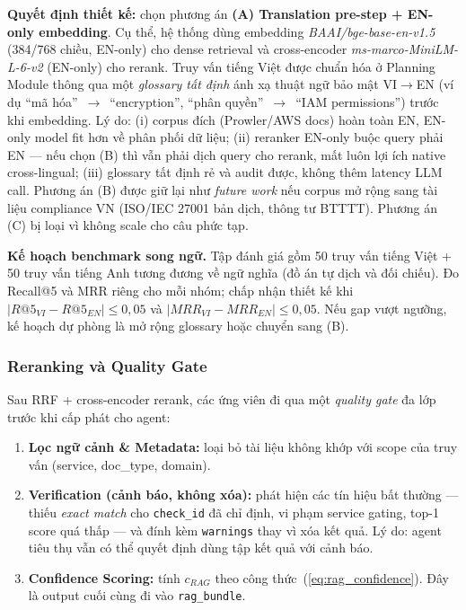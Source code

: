\textbf{Quyết định thiết kế:} chọn phương án \textbf{(A) Translation pre-step + EN-only embedding}. Cụ thể, hệ thống dùng embedding \textit{BAAI/bge-base-en-v1.5} (384/768 chiều, EN-only) cho dense retrieval và cross-encoder \textit{ms-marco-MiniLM-L-6-v2} (EN-only) cho rerank. Truy vấn tiếng Việt được chuẩn hóa ở Planning Module thông qua một \textit{glossary tất định} ánh xạ thuật ngữ bảo mật VI$\rightarrow$EN (ví dụ ``mã hóa''~$\rightarrow$~``encryption'', ``phân quyền''~$\rightarrow$~``IAM permissions'') trước khi embedding. Lý do: (i) corpus đích (Prowler/AWS docs) hoàn toàn EN, EN-only model fit hơn về phân phối dữ liệu; (ii) reranker EN-only buộc query phải EN — nếu chọn (B) thì vẫn phải dịch query cho rerank, mất luôn lợi ích native cross-lingual; (iii) glossary tất định rẻ và audit được, không thêm latency LLM call. Phương án (B) được giữ lại như \textit{future work} nếu corpus mở rộng sang tài liệu compliance VN (ISO/IEC 27001 bản dịch, thông tư BTTTT). Phương án (C) bị loại vì không scale cho câu phức tạp.

\textbf{Kế hoạch benchmark song ngữ.} Tập đánh giá gồm 50 truy vấn tiếng Việt + 50 truy vấn tiếng Anh tương đương về ngữ nghĩa (đồ án tự dịch và đối chiếu). Đo Recall@5 và MRR riêng cho mỗi nhóm; chấp nhận thiết kế khi $|R@5_{VI} - R@5_{EN}| \leq 0{,}05$ và $|MRR_{VI} - MRR_{EN}| \leq 0{,}05$. Nếu gap vượt ngưỡng, kế hoạch dự phòng là mở rộng glossary hoặc chuyển sang (B).

\subsubsection*{Reranking và Quality Gate}
\label{subsec:reranking_quality_gate}

Sau RRF + cross-encoder rerank, các ứng viên đi qua một \textit{quality gate} đa lớp trước khi cấp phát cho agent:

\begin{enumerate}
  \item \textbf{Lọc ngữ cảnh \& Metadata:} loại bỏ tài liệu không khớp với scope của truy vấn (service, doc\_type, domain).
  \item \textbf{Verification (cảnh báo, không xóa):} phát hiện các tín hiệu bất thường — thiếu \textit{exact match} cho \texttt{check\_id} đã chỉ định, vi phạm service gating, top-1 score quá thấp — và đính kèm \texttt{warnings} thay vì xóa kết quả. Lý do: agent tiêu thụ vẫn có thể quyết định dùng tập kết quả với cảnh báo.
  \item \textbf{Confidence Scoring:} tính $c_{RAG}$ theo công thức~(\ref{eq:rag_confidence}). Đây là output cuối cùng đi vào \texttt{rag\_bundle}.
\end{enumerate}

